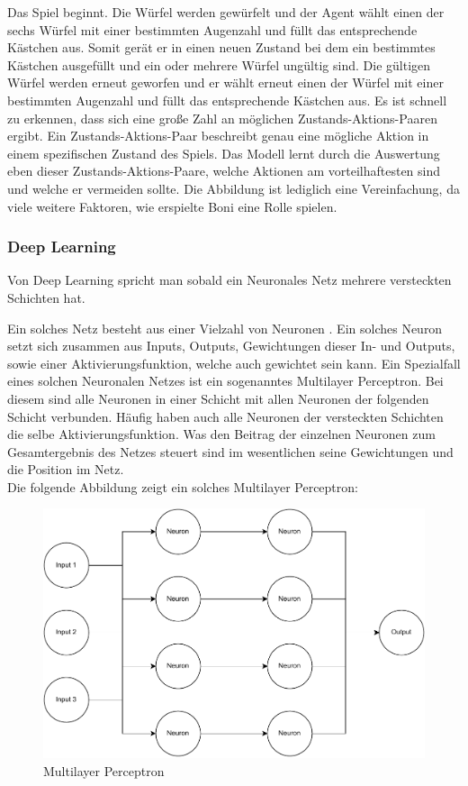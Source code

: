 Das Spiel beginnt. Die Würfel werden gewürfelt und der Agent wählt einen der sechs Würfel mit einer bestimmten Augenzahl und füllt das entsprechende Kästchen aus. Somit gerät er in einen neuen Zustand bei dem ein bestimmtes Kästchen ausgefüllt und ein oder mehrere Würfel ungültig sind. Die gültigen Würfel werden erneut geworfen und er wählt erneut einen der Würfel mit einer bestimmten Augenzahl und füllt das entsprechende Kästchen aus. Es ist schnell zu erkennen, dass sich eine große Zahl an möglichen Zustands-Aktions-Paaren ergibt. Ein Zustands-Aktions-Paar beschreibt genau eine mögliche Aktion in einem spezifischen Zustand des Spiels. Das Modell lernt durch die Auswertung eben dieser Zustands-Aktions-Paare, welche Aktionen am vorteilhaftesten sind und welche er vermeiden sollte. Die Abbildung ist lediglich eine Vereinfachung, da viele weitere Faktoren, wie erspielte Boni eine Rolle spielen.
\subsubsection{Deep Learning}
Von Deep Learning spricht man sobald ein Neuronales Netz mehrere versteckten Schichten hat. 

Ein solches Netz besteht aus einer Vielzahl von Neuronen \cite[Seite 75]{sewak_deep_2019}. Ein solches Neuron setzt sich zusammen aus Inputs, Outputs, Gewichtungen dieser In- und Outputs, sowie einer Aktivierungsfunktion, welche auch gewichtet sein kann. Ein Spezialfall eines solchen Neuronalen Netzes ist ein sogenanntes Multilayer Perceptron. Bei diesem sind alle Neuronen in einer Schicht mit allen Neuronen der folgenden Schicht verbunden. Häufig haben auch alle Neuronen der versteckten Schichten die selbe Aktivierungsfunktion. Was den Beitrag der einzelnen Neuronen zum Gesamtergebnis des Netzes steuert sind im wesentlichen seine Gewichtungen und die Position im Netz.\\

Die folgende Abbildung zeigt ein solches Multilayer Perceptron:
\nopagebreak
\begin{figure}[H]
	\includegraphics[width=1\textwidth]{Bilder/mlp2.drawio} 
	\caption[Multilayer Perceptron]{Multilayer Perceptron}
\end{figure}	

